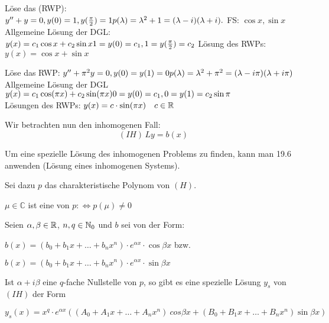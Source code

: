 \documentclass{article}
\begin{document}
\begin{beispiele}
\item Löse das  (RWP): \\
$y'' + y = 0, y(0) = 1, y(\frac{\pi}{2}) = 1 \\
p(\lambda) = \lambda ^2 + 1 = (\lambda - i)(\lambda + i).$ FS: $\cos x, \sin x$ \\
Allgemeine Lösung der DGL: $y(x) = c_1\cos x + c_2\sin x \\
1 = y(0) = c_1, 1 = y(\frac{\pi}{2}) = c_2$ Lösung des RWPs: $y(x) = \cos x + \sin x$

\item Löse das RWP:
$y'' + \pi ^2y = 0, y(0) = y(1) = 0 \\
p(\lambda) = \lambda ^2 + \pi ^2 = (\lambda - i\pi)(\lambda + i\pi)$ \\
Allgemeine Lösung der DGL $y(x) = c_1\cos (\pi x) + c_2\sin (\pi x) \\
0 = y(0) = c_1, 0 = y(1) = c_2 \sin \pi$ \\
Lösungen des RWPs: $y(x) = c\cdot\sin (\pi x) \quad c \in \mathbb{R}$


\end{beispiele}


Wir betrachten nun den inhomogenen Fall:
\begin{displaymath}
(IH) \, Ly = b(x)
\end{displaymath}

Um eine spezielle Lösung des inhomogenen Problems zu finden, kann man 19.6 anwenden (Lösung eines inhomogenen Systems).

Sei dazu $p$ das charakteristische Polynom von $(H)$. 
\begin{definition}
$\mu \in \mathbb{C}$ ist eine  von $p: \Leftrightarrow p(\mu) \ne 0$
\end{definition}


\begin{satz}
Seien $\alpha, \beta \in \mathbb{R}$, $n, q \in \mathbb{N}_0$ und $b$ sei von der Form:

$b(x)=(b_0+b_1x+ \dots +b_n x^n) \cdot e^{\alpha x} \cdot \cos \beta x$ bzw.

$b(x)=(b_0+b_1x+ \dots +b_n x^n) \cdot e^{\alpha x} \cdot \sin \beta x$

Ist $\alpha + i \beta$ eine $q$-fache Nullstelle von $p$, so gibt es eine spezielle Lösung $y_s$ von $(IH)$ der Form

$y_s(x)= x^q \cdot e^{\alpha x}((A_0+A_1 x+ \dots + A_n x^n)\ cos \beta x + (B_0 + B_1 x + \dots + B_n x^n) \sin \beta x)$
\end{satz}
\end{document}
